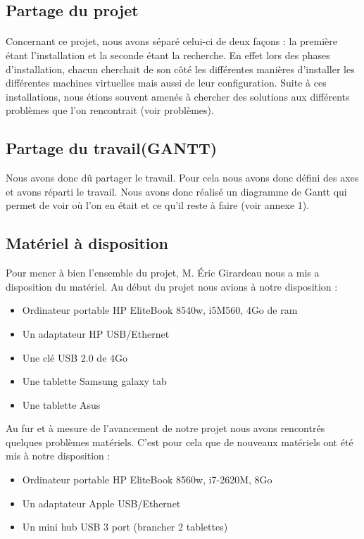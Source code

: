 \documentclass[a4paper,12pt]{extarticle}
\begin{document}
\subsection{Partage du projet}

\paragraph{}
Concernant ce projet, nous avons séparé celui-ci de deux façons : la première étant l’installation et la seconde étant la recherche. En effet lors des phases d’installation, 
chacun cherchait de son côté les différentes manières d’installer les différentes machines virtuelles mais aussi de leur configuration. Suite à ces installations, nous étions souvent amenés à chercher des solutions aux différents problèmes que l’on rencontrait (voir problèmes).

\subsection{Partage du travail(GANTT)}

Nous avons donc dû partager le travail. Pour cela nous avons donc défini des axes et avons réparti le travail. Nous avons donc réalisé un diagramme de Gantt qui permet de voir où l’on en était et ce qu’il reste à faire (voir annexe 1).\\

\subsection{Matériel à disposition}

Pour mener à bien l’ensemble du projet, M. Éric Girardeau nous a mis a disposition du matériel. Au début du projet nous avions à notre disposition :
\begin{itemize}
\item Ordinateur portable HP EliteBook 8540w, i5M560, 4Go de ram
\item Un adaptateur HP USB/Ethernet
\item Une clé USB 2.0 de 4Go
\item Une tablette Samsung galaxy tab
\item Une tablette Asus\\
\end{itemize}

Au fur et à mesure de l’avancement de notre projet nous avons rencontrés quelques problèmes matériels. C’est pour cela que de nouveaux matériels ont été mis à notre disposition :
\begin{itemize}
\item Ordinateur portable HP EliteBook 8560w, i7-2620M, 8Go
\item Un adaptateur Apple USB/Ethernet
\item Un mini hub USB 3 port (brancher 2 tablettes)
\end{itemize}
\end{document}
